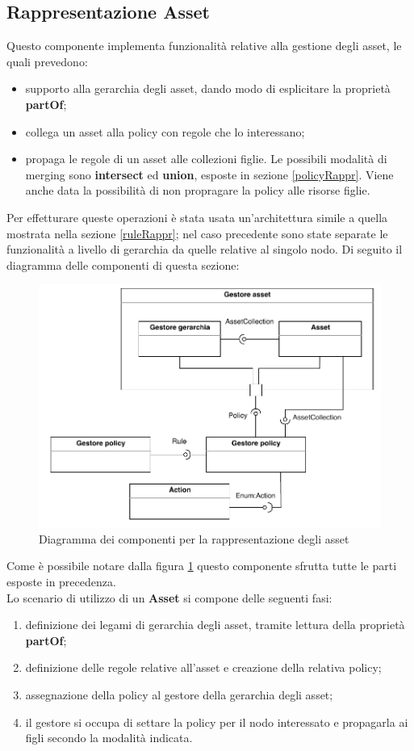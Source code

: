 \documentclass[12pt,a4paper,twoside]{book}
\begin{document}
\subsection{Rappresentazione Asset}\label{assetFun}
Questo componente implementa funzionalità relative alla gestione degli asset, le quali prevedono:
\begin{itemize}
\item supporto alla gerarchia degli asset, dando modo di esplicitare la proprietà \textbf{partOf};
\item collega un asset alla policy con regole che lo interessano;
\item propaga le regole di un asset alle collezioni figlie. Le possibili modalità di merging sono \textbf{intersect} ed \textbf{union}, esposte in sezione \ref{policyRappr}. Viene anche data la possibilità di non propragare la policy alle risorse figlie.
\end{itemize}
Per effetturare queste operazioni è stata usata un'architettura simile a quella mostrata nella sezione \ref{ruleRappr}; nel caso precedente sono state separate le funzionalità a livello di gerarchia da quelle relative al singolo nodo. Di seguito il diagramma delle componenti di questa sezione:
\begin{figure}[H]
\centering
\includegraphics[scale=.7]{../immagini/compAsset.pdf}
\caption{Diagramma dei componenti per la rappresentazione degli asset}
\label{compAssetImg}
\end{figure}
Come è possibile notare dalla figura \ref{compAssetImg} questo componente sfrutta tutte le parti esposte in precedenza.\\
Lo scenario di utilizzo di un \textbf{Asset} si compone delle seguenti fasi:
\begin{enumerate}
\item definizione dei legami di gerarchia degli asset, tramite lettura della proprietà \textbf{partOf};
\item definizione delle regole relative all'asset e creazione della relativa policy;
\item assegnazione della policy al gestore della gerarchia degli asset;
\item il gestore si occupa di settare la policy per il nodo interessato e propagarla ai figli secondo la modalità indicata.
\end{enumerate}
\end{document}
